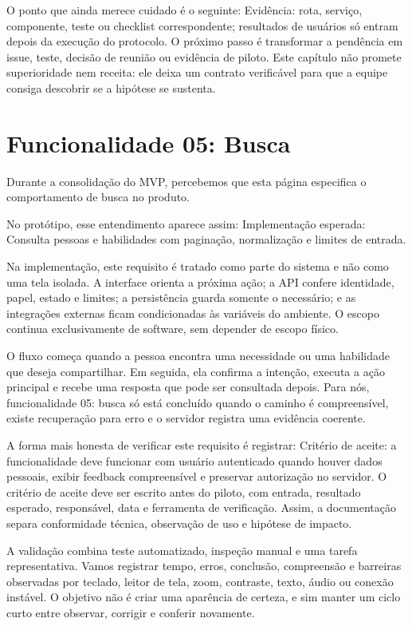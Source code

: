 \documentclass[12pt,oneside,a4paper,article]{abntex2}
\begin{document}
O ponto que ainda merece cuidado é o seguinte: Evidência: rota, serviço, componente, teste ou checklist correspondente; resultados de usuários só entram depois da execução do protocolo. O próximo passo é transformar a pendência em issue, teste, decisão de reunião ou evidência de piloto. Este capítulo não promete superioridade nem receita: ele deixa um contrato verificável para que a equipe consiga descobrir se a hipótese se sustenta.

\section{Funcionalidade 05: Busca}
Durante a consolidação do MVP, percebemos que esta página especifica o comportamento de busca no produto.

No protótipo, esse entendimento aparece assim: Implementação esperada: Consulta pessoas e habilidades com paginação, normalização e limites de entrada.

Na implementação, este requisito é tratado como parte do sistema e não como uma tela isolada. A interface orienta a próxima ação; a API confere identidade, papel, estado e limites; a persistência guarda somente o necessário; e as integrações externas ficam condicionadas às variáveis do ambiente. O escopo continua exclusivamente de software, sem depender de escopo físico.

O fluxo começa quando a pessoa encontra uma necessidade ou uma habilidade que deseja compartilhar. Em seguida, ela confirma a intenção, executa a ação principal e recebe uma resposta que pode ser consultada depois. Para nós, funcionalidade 05: busca só está concluído quando o caminho é compreensível, existe recuperação para erro e o servidor registra uma evidência coerente.

A forma mais honesta de verificar este requisito é registrar: Critério de aceite: a funcionalidade deve funcionar com usuário autenticado quando houver dados pessoais, exibir feedback compreensível e preservar autorização no servidor. O critério de aceite deve ser escrito antes do piloto, com entrada, resultado esperado, responsável, data e ferramenta de verificação. Assim, a documentação separa conformidade técnica, observação de uso e hipótese de impacto.

A validação combina teste automatizado, inspeção manual e uma tarefa representativa. Vamos registrar tempo, erros, conclusão, compreensão e barreiras observadas por teclado, leitor de tela, zoom, contraste, texto, áudio ou conexão instável. O objetivo não é criar uma aparência de certeza, e sim manter um ciclo curto entre observar, corrigir e conferir novamente.
\end{document}
